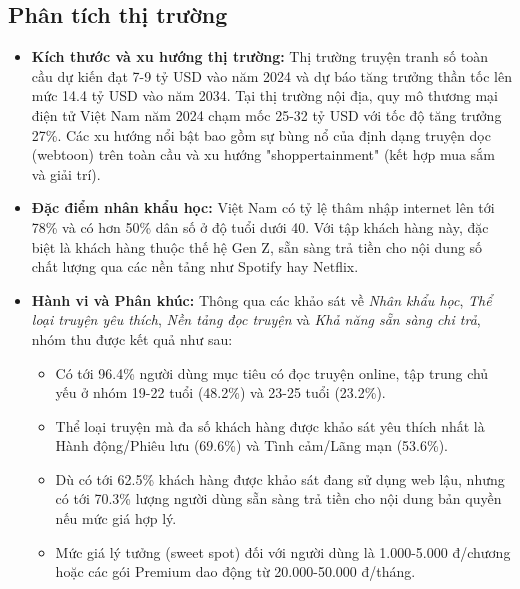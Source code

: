 \subsection{Phân tích thị trường}
\begin{itemize}
    \item \textbf{Kích thước và xu hướng thị trường:} Thị trường truyện tranh số toàn cầu dự kiến đạt 7-9 tỷ USD vào năm 2024 và dự báo tăng trưởng thần tốc lên mức 14.4 tỷ USD vào năm 2034. Tại thị trường nội địa, quy mô thương mại điện tử Việt Nam năm 2024 chạm mốc 25-32 tỷ USD với tốc độ tăng trưởng 27\%. Các xu hướng nổi bật bao gồm sự bùng nổ của định dạng truyện dọc (webtoon) trên toàn cầu và xu hướng "shoppertainment" (kết hợp mua sắm và giải trí).
    \item \textbf{Đặc điểm nhân khẩu học:} Việt Nam có tỷ lệ thâm nhập internet lên tới 78\% và có hơn 50\% dân số ở độ tuổi dưới 40. Với tập khách hàng này, đặc biệt là khách hàng thuộc thế hệ Gen Z, sẵn sàng trả tiền cho nội dung số chất lượng qua các nền tảng như Spotify hay Netflix.
    \item \textbf{Hành vi và Phân khúc:} Thông qua các khảo sát về \textit{Nhân khẩu học}, \textit{Thể loại truyện yêu thích}, \textit{Nền tảng đọc truyện} và \textit{Khả năng sẵn sàng chi trả}, nhóm thu được kết quả như sau:

    \begin{itemize}
        \item Có tới 96.4\% người dùng mục tiêu có đọc truyện online, tập trung chủ yếu ở nhóm 19-22 tuổi (48.2\%) và 23-25 tuổi (23.2\%).
        \item Thể loại truyện mà đa số khách hàng được khảo sát yêu thích nhất là Hành động/Phiêu lưu (69.6\%) và Tình cảm/Lãng mạn (53.6\%).
        \item Dù có tới 62.5\% khách hàng được khảo sát đang sử dụng web lậu, nhưng có tới 70.3\% lượng người dùng sẵn sàng trả tiền cho nội dung bản quyền nếu mức giá hợp lý.
        \item Mức giá lý tưởng (sweet spot) đối với người dùng là 1.000-5.000 đ/chương hoặc các gói Premium dao động từ 20.000-50.000 đ/tháng.
    \end{itemize}
\end{itemize}

